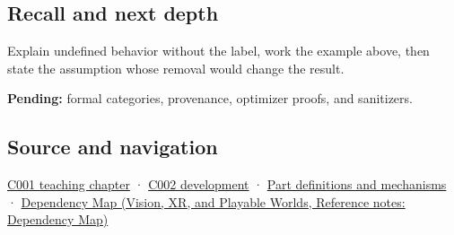 \subsection{Recall and next depth}\label{appendix-f558f5b4d8f2-recall-and-next-depth}

Explain undefined behavior without the label, work the example above, then state the assumption whose removal would change the result.

\textbf{Pending:} formal categories, provenance, optimizer proofs, and sanitizers.

\subsection{Source and navigation}\label{appendix-f558f5b4d8f2-source-and-navigation}

\hyperref[01-foundations-i-ch001-from-a-signal-to-an-interpretation]{C001 teaching chapter} · \hyperref[01-foundations-i-ch001-arithmetic-becomes-a-policy]{C002 development} · \hyperref[appendix-fd090d982a15]{Part definitions and mechanisms} · \href{../07-Vision-XR-and-Playable-Worlds/main.pdf\#nameddest=appendix-4ad47bdd269a}{Dependency Map (Vision, XR, and Playable Worlds, Reference notes: Dependency Map)}

